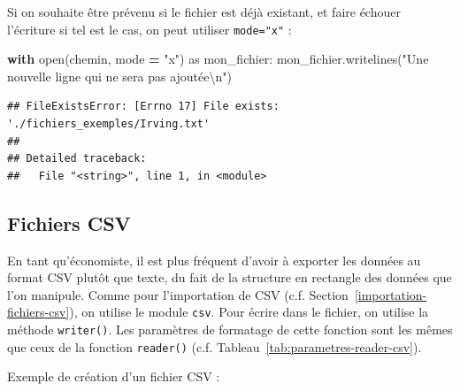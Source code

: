 \documentclass[12pt,]{book}
\newenvironment{Shaded}{\begin{snugshade}}{\end{snugshade}}
\newcommand{\CharTok}[1]{\textcolor[rgb]{0.31,0.60,0.02}{#1}}
\newcommand{\StringTok}[1]{\textcolor[rgb]{0.31,0.60,0.02}{#1}}
\newcommand{\ImportTok}[1]{#1}
\newcommand{\ControlFlowTok}[1]{\textcolor[rgb]{0.13,0.29,0.53}{\textbf{#1}}}
\newcommand{\OperatorTok}[1]{\textcolor[rgb]{0.81,0.36,0.00}{\textbf{#1}}}
\newcommand{\BuiltInTok}[1]{#1}
\newcommand{\NormalTok}[1]{#1}
\numberwithin{equation}{section}
\numberwithin{countremarque}{section}
\begin{document}
Si on souhaite être prévenu si le fichier est déjà existant, et faire
échouer l'écriture si tel est le cas, on peut utiliser \texttt{mode="x"}
:

\begin{Shaded}
\begin{Highlighting}[]
\ControlFlowTok{with} \BuiltInTok{open}\NormalTok{(chemin, mode }\OperatorTok{=} \StringTok{"x"}\NormalTok{) }\ImportTok{as}\NormalTok{ mon_fichier:}
\NormalTok{  mon_fichier.writelines(}\StringTok{"Une nouvelle ligne qui ne sera pas ajoutée}\CharTok{\textbackslash{}n}\StringTok{"}\NormalTok{)}
\end{Highlighting}
\end{Shaded}

\begin{lstlisting}
## FileExistsError: [Errno 17] File exists: './fichiers_exemples/Irving.txt'
## 
## Detailed traceback: 
##   File "<string>", line 1, in <module>
\end{lstlisting}

\subsection{Fichiers CSV}\label{fichiers-csv}

En tant qu'économiste, il est plus fréquent d'avoir à exporter les
données au format CSV plutôt que texte, du fait de la structure en
rectangle des données que l'on manipule. Comme pour l'importation de CSV
(c.f. Section~\ref{importation-fichiers-csv}), on utilise le module
\texttt{csv}. Pour écrire dans le fichier, on utilise la méthode
\texttt{writer()}. Les paramètres de formatage de cette fonction sont
les mêmes que ceux de la fonction \texttt{reader()} (c.f.
Tableau~\ref{tab:parametres-reader-csv}).

Exemple de création d'un fichier CSV :
\end{document}
